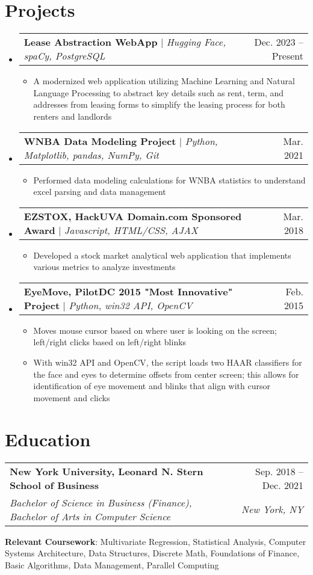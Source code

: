 \documentclass[letterpaper,11pt]{article}
\makeatletter
\newcommand{\resumeItem}[1]{
  \item\small{
    {#1 \vspace{-2pt}}
  }
}
\newcommand{\resumeSubheading}[4]{
  \vspace{-2pt}\item
    \begin{tabular*}{0.97\textwidth}[t]{l@{\extracolsep{\fill}}r}
      \textbf{#1} & #2 \\
      \textit{\small#3} & \textit{\small #4} \\
    \end{tabular*}\vspace{-7pt}
}
\newcommand{\resumeProjectHeading}[2]{
    \item
    \begin{tabular*}{0.97\textwidth}{l@{\extracolsep{\fill}}r}
      \small#1 & #2 \\
    \end{tabular*}\vspace{-7pt}
}
\newcommand{\resumeSubHeadingListStart}{\begin{itemize}[leftmargin=0.15in, label={}]}
\newcommand{\resumeSubHeadingListEnd}{\end{itemize}}
\newcommand{\resumeItemListStart}{\begin{itemize}}
\newcommand{\resumeItemListEnd}{\end{itemize}\vspace{-5pt}}
\makeatother
\begin{document}
\section{Projects}
    \resumeSubHeadingListStart
        \resumeProjectHeading
          {\textbf{Lease Abstraction WebApp} $|$ \emph{Hugging Face, spaCy, PostgreSQL}}
          {Dec. 2023 -- Present}
          \resumeItemListStart
            \resumeItem{A modernized web application utilizing Machine Learning and Natural Language Processing to abstract key details such as rent, term, and addresses from leasing forms to simplify the leasing process for both renters and landlords}
          \resumeItemListEnd
        \resumeProjectHeading
          {\textbf{WNBA Data Modeling Project} $|$ \emph{Python, Matplotlib, pandas, NumPy, Git}}{Mar. 2021}
          \resumeItemListStart
            \resumeItem{Performed data modeling calculations for WNBA statistics to understand excel parsing and data management}
          \resumeItemListEnd
        \resumeProjectHeading
          {\textbf{EZSTOX, HackUVA Domain.com Sponsored Award} $|$ \emph{Javascript, HTML/CSS, AJAX}}{Mar. 2018}
          \resumeItemListStart
            \resumeItem{Developed a stock market analytical web application that implements various metrics to analyze investments}
          \resumeItemListEnd
        \resumeProjectHeading
          {\textbf{EyeMove, PilotDC 2015 "Most Innovative" Project} $|$ \emph{Python, win32 API, OpenCV}}{Feb. 2015}
          \resumeItemListStart
            \resumeItem{Moves mouse cursor based on where user is looking on the screen; left/right clicks based on left/right blinks}
            \resumeItem{With win32 API and OpenCV, the script loads two HAAR classifiers for the face and eyes to determine offsets from center screen; this allows for identification of eye movement and blinks that align with cursor movement and clicks}
          \resumeItemListEnd
    \resumeSubHeadingListEnd

\section{Education}
  \resumeSubHeadingListStart
    \resumeSubheading
      {New York University, Leonard N. Stern School of Business}{Sep. 2018 -- Dec. 2021}
      {Bachelor of Science in Business (Finance), Bachelor of Arts in Computer Science}{New York, NY}
    \small{\item{
        \textbf{Relevant Coursework}{: Multivariate Regression, Statistical Analysis, Computer Systems Architecture, Data Structures, Discrete Math, Foundations of Finance, Basic Algorithms, Data Management, Parallel Computing} \\
    }}
  \resumeSubHeadingListEnd
\end{document}
